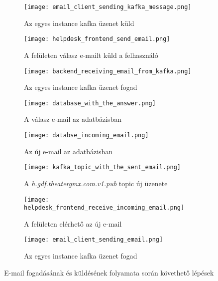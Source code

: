 \begin{figure}
	\begin{subfigure}{.49\textwidth}
		\centering
		\texttt{[image: email\_client\_sending\_kafka\_message.png]}  
		\caption{Az egyes instance kafka üzenet küld}
		\label{fig:email_client_send_kafka}
	\end{subfigure}
	\begin{subfigure}{.49\textwidth}
		\centering
		\texttt{[image: helpdesk\_frontend\_send\_email.png]}  
		\caption{A felületen válasz e-mailt küld a felhasználó}
		\label{fig:frontend_send_answer}
	\end{subfigure}
	
	\quad
	
	\begin{subfigure}{.49\textwidth}
		\centering
		\texttt{[image: backend\_receiving\_email\_from\_kafka.png]}  
		\caption{Az egyes instance kafka üzenet fogad}
		\label{fig:backend_receive_kafka}
	\end{subfigure}
	\begin{subfigure}{.49\textwidth}
		\centering
		\texttt{[image: database\_with\_the\_answer.png]}  
		\caption{A válasz e-mail az adatbázisban}
		\label{fig:database_answer}
	\end{subfigure}

	\quad

\begin{subfigure}{.49\textwidth}
	\centering
	\texttt{[image: databse\_incoming\_email.png]}  
	\caption{Az új e-mail az adatbázisban}
	\label{fig:datbase_received_email}
\end{subfigure}
\begin{subfigure}{.49\textwidth}
	\centering
	\texttt{[image: kafka\_topic\_with\_the\_sent\_email.png]}  
	\caption{A \textit{h.gdf.theater\textunderscore gmx.com.v1.pub} topic új üzenete}
	\label{fig:kafka_topic_send_email}
\end{subfigure}

	\quad

\begin{subfigure}{.45\textwidth}
	\centering
	\texttt{[image: helpdesk\_frontend\_receive\_incoming\_email.png]}  
	\caption{A felületen elérhető az új e-mail}
	\label{fig:frontend_read_email}
\end{subfigure}
\begin{subfigure}{.45\textwidth}
	\centering
	\texttt{[image: email\_client\_sending\_email.png]}  
	\caption{Az egyes instance kafka üzenet fogad}
	\label{fig:email_client_receives_kafka}
\end{subfigure}

	\caption{E-mail fogadásának és küldésének folyamata során követhető lépések}
	\label{fig:email_send_receive_visible}
\end{figure}



